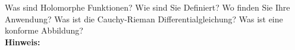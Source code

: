 \begin{question}[section=3,subsection=32,name={Holomorphe Funktionen},difficulty=9,type=mdl,tags={}]
	Was sind Holomorphe Funktionen? Wie sind Sie Definiert? Wo finden Sie Ihre Anwendung? Was ist die Cauchy-Rieman Differentialgleichung? Was ist eine konforme Abbildung?
	\\ \textbf{Hinweis:}\\
	
\end{question}
\begin{solution}
	
\end{solution}